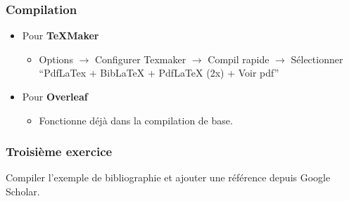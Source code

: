 \begin{frame}[fragile]
  \frametitle{\Warning Compilation}
  \begin{itemize}
      \item Pour \textbf{TeXMaker}
      \begin{itemize}
          \item Options $\rightarrow$ Configurer Texmaker $\rightarrow$ Compil rapide $\rightarrow$ Sélectionner ``PdfLaTex + BibLaTeX + PdfLaTeX (2x) + Voir pdf''
      \end{itemize}
      \item Pour \textbf{Overleaf}
      \begin{itemize}
          \item Fonctionne déjà dans la compilation de base.
      \end{itemize}
  \end{itemize}
\end{frame}

\begin{frame}[fragile]
  \frametitle{Troisième exercice}
  \begin{center}
      Compiler l'exemple de bibliographie et ajouter une référence depuis Google Scholar.\vspace{0.5cm}
  \end{center}
\end{frame}


